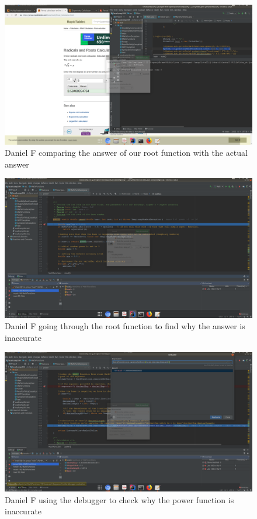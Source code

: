 \documentclass[a4paper, 12pt]{article}
\begin{document}
\vspace{20mm}
\begin{figure}[H]
\centering
\includegraphics[width=1.13\textwidth]{Dany1.png}
\caption{Daniel F comparing the answer of our root function with the actual answer}
\label{Dany1}
\end{figure}

\vspace{20mm}
\begin{figure}[H]
\centering
\includegraphics[width=1.13\textwidth]{Dany2.png}
\caption{Daniel F going through the root function to find why the answer is inaccurate }
\label{Dany2}
\end{figure}

\vspace{20mm}
\begin{figure}[H]
\centering
\includegraphics[width=1.13\textwidth]{Dany3.png}
\caption{Daniel F using the debugger to check why the power function is inaccurate}
\label{Dany3}
\end{figure}
\end{document}
